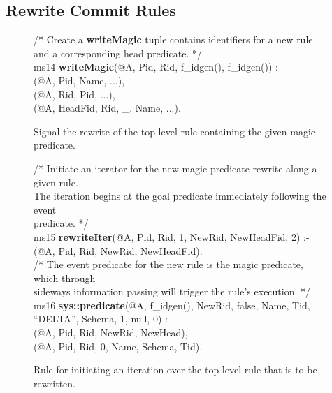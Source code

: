 \subsection{Rewrite Commit Rules}
\label{ch:magic:sec:rewrite}

\begin{figure}[!t]
\ssp
\centering
\begin{boxedminipage}{\linewidth}
/* Create a {\bf writeMagic} tuple contains identifiers for a new rule \\
and a corresponding head predicate. */ \\
ms14 {\bf writeMagic}(@A, Pid, Rid, f\_idgen(), f\_idgen()) :- \\
(@A, Pid, Name, ...), \\
(@A, Rid, Pid, ...), \\
(@A, HeadFid, Rid, \_, Name, ...). \\
\end{boxedminipage}
\caption{\label{ch:evita:fig:mpgoal} Signal the rewrite of the top level rule 
containing the given magic predicate.}
\end{figure}

\begin{figure}[!t]
\ssp
\centering
\begin{boxedminipage}{\linewidth}
/* Initiate an iterator for the new magic predicate rewrite along a given rule.  \\
The iteration begins at the goal predicate immediately following the event \\
predicate. */ \\
ms15 {\bf rewriteIter}(@A, Pid, Rid, 1, NewRid, NewHeadFid, 2) :- \\
(@A, Pid, Rid, NewRid, NewHeadFid). \\

/* The event predicate for the new rule is the magic predicate, which through \\
sideways information passing will trigger the rule's execution. */ \\ 
ms16 {\bf sys::predicate}(@A, f\_idgen(), NewRid, false, Name, Tid, ``DELTA'', Schema, 1, null, 0) :- \\
(@A, Pid, Rid, NewRid, NewHead), \\
(@A, Pid, Rid, 0, Name, Schema, Tid).

\end{boxedminipage}
\caption{\label{ch:evita:fig:mpgoal} Rule for initiating an iteration over the
top level rule that is to be rewritten. }
\end{figure}


